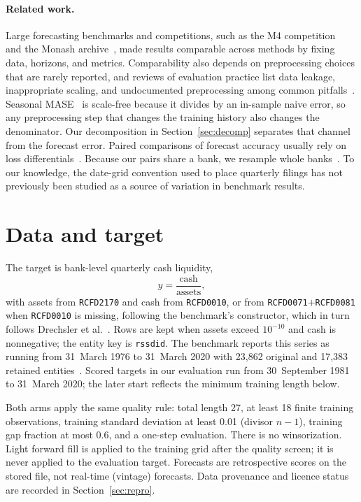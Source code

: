 \documentclass[11pt]{article}
\begin{document}
\paragraph{Related work.} Large forecasting benchmarks and competitions, such as the M4 competition~\cite{makridakis2020} and the Monash archive~\cite{godahewa2021}, made results comparable across methods by fixing data, horizons, and metrics. Comparability also depends on preprocessing choices that are rarely reported, and reviews of evaluation practice list data leakage, inappropriate scaling, and undocumented preprocessing among common pitfalls~\cite{tashman2000,hewamalage2023}. Seasonal MASE~\cite{hyndman2006} is scale-free because it divides by an in-sample naive error, so any preprocessing step that changes the training history also changes the denominator. Our decomposition in Section~\ref{sec:decomp} separates that channel from the forecast error. Paired comparisons of forecast accuracy usually rely on loss differentials~\cite{diebold1995}. Because our pairs share a bank, we resample whole banks~\cite{davison1997,field2007,cameron2008}. To our knowledge, the date-grid convention used to place quarterly filings has not previously been studied as a source of variation in benchmark results.

\section{Data and target}
The target is bank-level quarterly cash liquidity,
\[
  y = \frac{\text{cash}}{\text{assets}},
\]
with assets from \texttt{RCFD2170} and cash from \texttt{RCFD0010}, or from \texttt{RCFD0071}$+$\texttt{RCFD0081} when \texttt{RCFD0010} is missing, following the benchmark's constructor, which in turn follows Drechsler et al.~\cite{drechsler2017}. Rows are kept when assets exceed $10^{-10}$ and cash is nonnegative; the entity key is \texttt{rssdid}. The benchmark reports this series as running from 31~March 1976 to 31~March 2020 with 23,862 original and 17,383 retained entities~\cite{bejarano2026}. Scored targets in our evaluation run from 30~September 1981 to 31~March 2020; the later start reflects the minimum training length below.

Both arms apply the same quality rule: total length 27, at least 18 finite training observations, training standard deviation at least 0.01 (divisor $n-1$), training gap fraction at most 0.6, and a one-step evaluation. There is no winsorization. Light forward fill is applied to the training grid after the quality screen; it is never applied to the evaluation target. Forecasts are retrospective scores on the stored file, not real-time (vintage) forecasts. Data provenance and licence status are recorded in Section~\ref{sec:repro}.
\end{document}
